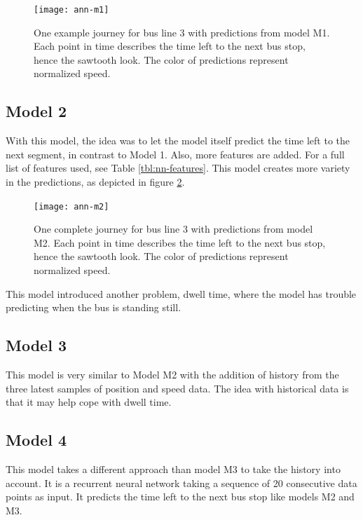 \begin{figure}[h]
  \begin{minipage}{\textwidth}
    \begin{adjustbox}{center}
      \texttt{[image: ann-m1]}
    \end{adjustbox}  
      \caption{One example journey for bus line 3 with predictions from model M1. Each point in time describes the time left to the next bus stop, hence the sawtooth look. The color of predictions represent normalized speed.}
      \label{fig:ann-m1}      
    \end{minipage}
\end{figure}


\subsection{Model 2}\label{M2}
With this model, the idea was to let the model itself predict the time left to the next segment, in contrast to Model 1. Also, more features are added. For a full list of features used, see Table \ref{tbl:nn-features}. This model creates more variety in the predictions, as depicted in figure \ref{fig:ann-m2}.


\begin{figure}[h]
  \begin{minipage}{\textwidth}
    \begin{adjustbox}{center}
      \texttt{[image: ann-m2]}
    \end{adjustbox}  
      \caption{One complete journey for bus line 3 with predictions from model M2. Each point in time describes the time left to the next bus stop, hence the sawtooth look. The color of predictions represent normalized speed.}
      \label{fig:ann-m2}      
    \end{minipage}
\end{figure}

This model introduced another problem, dwell time, where the model has trouble predicting when the bus is standing still. 

\subsection{Model 3}\label{M3}
This model is very similar to Model M2 with the addition of history from the three latest samples of position and speed data. The idea with historical data is that it may help cope with dwell time.

\subsection{Model 4}
This model takes a different approach than model M3 to take the history into account. It is a recurrent neural network taking a sequence of 20 consecutive data points as input. It predicts the time left to the next bus stop like models M2 and M3. 

